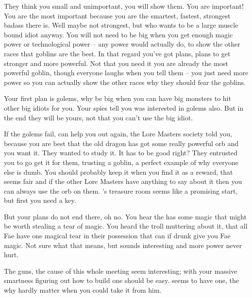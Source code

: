 \documentclass[char]{guildcamp2}
\begin{document}
\name{\cGoblin{}}




They think you small and unimportant, you will show them. You are important! You are the most important because you are the smartest, fastest, strongest badass there is. Well maybe not strongest, but who wants to be a large muscle bound idiot anyway. You will not need to be big when you get enough magic power or technological power -- any power would actually do, to show the other races that goblins are the best. In that regard you've got plans, plans to get stronger and more powerful.  Not that you need it you are already the most powerful goblin, though everyone laughs when you tell them -- you just need more power so you can actually show the other races why they should fear the goblins. 

Your first plan is golems, why be big when you can have big monsters to hit other big idiots for you. Your spies tell you \cOnyx{} was interested in golems also. But in the end they will be yours, not that you can't use the big idiot.

If the golems fail, \cOnyx{} can help you out again, the Lore Masters society told you, because you are best that the old dragon has got some really powerful orb and you want it. They wanted to study it. It has to be good right? They entrusted you to go get it for them, trusting a goblin, a perfect example of why everyone else is dumb. You should probably keep it when you find it as a reward, that seems fair and if the other Lore Masters have anything to say about it then you can always use the orb on them. \cOnyx{}'s treasure room seems like a promising start, but first you need a key.  

But your plans do not end there, oh no. You hear the \cTreeFae{} has some magic that might be worth stealing a tear of magic. You heard the troll muttering about it, that all Fae have one magical tear in their possession that can if drunk give you Fae magic. Not sure what that means, but sounds interesting and more power never hurt.

The guns, the cause of this whole meeting seem interesting; with your massive smartness figuring out how to build one should be easy. \cCleric{} seems to have one, the why hardly matter when you could take it from him. 
\end{document}
